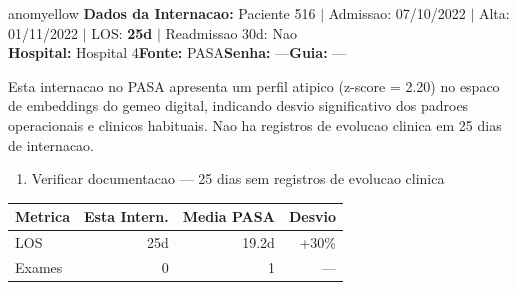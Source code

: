 \documentclass[a4paper,10pt]{article}
\begin{document}
\begin{anomalycard}[Internacao 80407 | PASA | MODERADO (z=2.20)]{anomyellow}
\textbf{Dados da Internacao:} Paciente 516 $\mid$ Admissao: 07/10/2022 $\mid$ Alta: 01/11/2022 $\mid$ LOS: \textbf{25d} $\mid$ Readmissao 30d: Nao\\
\textbf{Hospital:} Hospital 4\quad\textbf{Fonte:} PASA\quad\textbf{Senha:} ---\quad\textbf{Guia:} ---\\
\vspace{2pt}\begin{tcolorbox}[colback=severityred!20,colframe=anomyellow,title={\textbf{Interpretacao de Negocio}},fonttitle=\bfseries\small,left=4pt,right=4pt,top=3pt,bottom=3pt]
{\small Esta internacao no PASA apresenta um perfil atipico (z-score = 2.20) no espaco de embeddings do gemeo digital, indicando desvio significativo dos padroes operacionais e clinicos habituais. Nao ha registros de evolucao clinica em 25 dias de internacao.}
\end{tcolorbox}
\begin{tcolorbox}[colback=severityyellow!30,colframe=anomorange,title={\textbf{Recomendacoes Especificas}},fonttitle=\bfseries\small,left=4pt,right=4pt,top=3pt,bottom=3pt]
\begin{enumerate}[nosep,leftmargin=16pt]
\item {\small Verificar documentacao --- 25 dias sem registros de evolucao clinica}
\end{enumerate}
\end{tcolorbox}
\begin{center}\begin{tabular}{l r r r}\toprule\textbf{Metrica} & \textbf{Esta Intern.} & \textbf{Media PASA} & \textbf{Desvio} \\\midrule
LOS & 25d & 19.2d & +30\% \\
Exames & 0 & 1 & --- \\
\bottomrule\end{tabular}\end{center}


\end{anomalycard}
\end{document}
